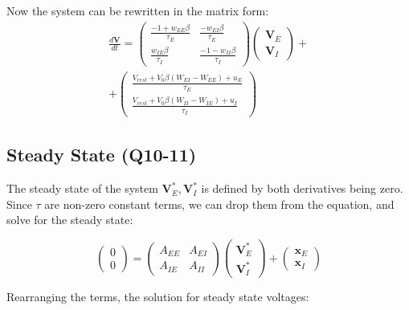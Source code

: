 \documentclass[10pt,twocolumn]{article}
\begin{document}
Now the system can be rewritten in the matrix form:
$$
    \begin{gathered}
        \frac{d\textbf{V}}{dt}
        =
        \begin{pmatrix}
            \frac{-1 + w_{EE}\beta}{\tau_E} & \frac{-w_{EI}\beta}{\tau_E}     \\
            \frac{w_{IE}\beta}{\tau_I}      & \frac{-1 - w_{II}\beta}{\tau_I}
        \end{pmatrix}
        \begin{pmatrix}
            \textbf{V}_E \\ \textbf{V}_I
        \end{pmatrix}+
        \\
        +
        \begin{pmatrix}
            \frac{V_{rest} + V_0\beta(W_{EI}-W_{EE}) + u_E}{\tau_E} \\
            \frac{V_{rest} + V_0\beta(W_{II}-W_{IE}) + u_I}{\tau_I}
        \end{pmatrix}
    \end{gathered}
$$


\subsection{Steady State (Q10-11)}
The steady state of the system $\textbf{V}^\ast_E,\textbf{V}^\ast_I$ is defined  by
both derivatives being zero. Since $\tau$ are non-zero constant terms, we can drop
them from the equation, and solve for the steady state:

$$
    \begin{pmatrix}
        0 \\ 0
    \end{pmatrix}
    =
    \begin{pmatrix}
        A_{EE} & A_{EI} \\
        A_{IE} & A_{II}
    \end{pmatrix}
    \begin{pmatrix}
        \textbf{V}^\ast_E \\ \textbf{V}^\ast_I
    \end{pmatrix}+
    \begin{pmatrix}
        \textbf{x}_E \\ \textbf{x}_I
    \end{pmatrix}
$$

Rearranging the terms, the solution for steady state voltages:
\end{document}
